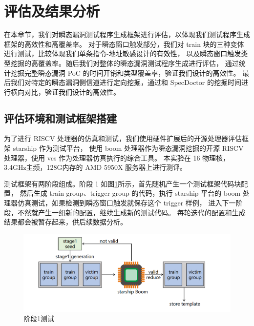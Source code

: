 \cleardoublepage
\section{评估及结果分析}

在本章节，我们对瞬态漏洞测试程序生成框架进行评估，以体现我们测试程序生成框架的高效性和高覆盖率。
对于瞬态窗口触发部分，我们对 train 块的三种变体进行测试，比较体现我们单条指令-地址敏感设计的有效性，
以及瞬态窗口触发类型挖掘的高覆盖率。随后我们对整体的瞬态漏洞测试程序生成进行评估，
通过统计挖掘完整瞬态漏洞 PoC 的时间开销和类型覆盖率，验证我们设计的高效性。
最后我们对特定的瞬态漏洞侧信道进行定向挖掘，通过和 SpecDoctor 的挖掘时间进行横向对比，验证我们设计的高效性。\par

\subsection{评估环境和测试框架搭建}

为了进行 RISCV 处理器的仿真和测试，我们使用硬件扩展后的开源处理器评估框架 starship 作为测试平台，
使用 boom 处理器作为瞬态漏洞挖掘的开源 RISCV 处理器，使用 vcs 作为处理器仿真执行的综合工具。
本实验在 16 物理核，3.4GHz主频，128G内存的 AMD 5950X 服务器上进行测评。\par

测试框架有两阶段组成。阶段 1 如图\ref{paper:stage1-test}所示，首先随机产生一个测试框架代码块配置，
然后生成 train group、trigger group 的代码，执行 starship 平台的
boom 处理器仿真测试，如果检测到瞬态窗口触发就保存这个 trigger 样例，
进入下一阶段，不然就产生一组新的配置，继续生成新的测试代码。
每轮迭代的配置和生成结果都会被暂存起来，供后续数据分析。\par

\begin{figure}[!h]
    \centering
    \includegraphics[width=\linewidth]{figure/paper/stage1-test.png}
    \caption{阶段1测试}
    \label{paper:stage1-test}
\end{figure}

